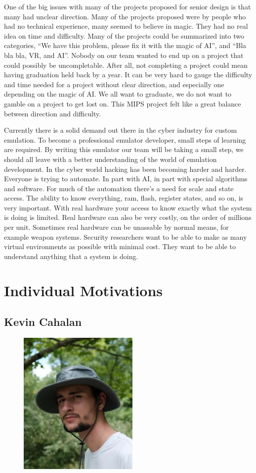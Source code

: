 \documentclass[parskip=half, fontsize=12pt]{scrartcl}
\let\oldsection\section
\renewcommand\section{\newpage\oldsection}
\begin{document}
One of the big issues with many of the projects proposed for senior design is that many had unclear direction. Many of the projects proposed were by people who had no technical experience, many seemed to believe in magic. They had no real idea on time and difficulty. Many of the projects could be summarized into two categories, “We have this problem, please fix it with the magic of AI”, and “Bla bla bla, VR, and AI”. Nobody on our team wanted to end up on a project that could possibly be uncompletable. After all, not completing a project could mean having graduation held back by a year. It can be very hard to gauge the difficulty and time needed for a project without clear direction, and especially one depending on the magic of AI. We all want to graduate, we do not want to gamble on a project to get lost on. This MIPS project felt like a great balance between direction and difficulty.

Currently there is a solid demand out there in the cyber industry for custom emulation. To become a professional emulator developer, small steps of learning are required. By writing this emulator our team will be taking a small step, we should all leave with a better understanding of the world of emulation development. In the cyber world hacking has been becoming harder and harder. Everyone is trying to automate. In part with AI, in part with special algorithms and software. For much of the automation there's a need for scale and state access. The ability to know everything, ram, flash, register states, and so on, is very important. With real hardware your access to know exactly what the system is doing is limited. Real hardware can also be very costly, on the order of millions per unit. Sometimes real hardware can be unassable by normal means, for example weapon systems. Security researchers want to be able to make as many virtual environments as possible with minimal cost. They want to be able to understand anything that a system is doing.

\section{Individual Motivations}
\subsection{Kevin Cahalan}
\begin{figure}[H]
    \includegraphics[height=7cm]{profile-kevin}
\end{figure}
\end{document}
